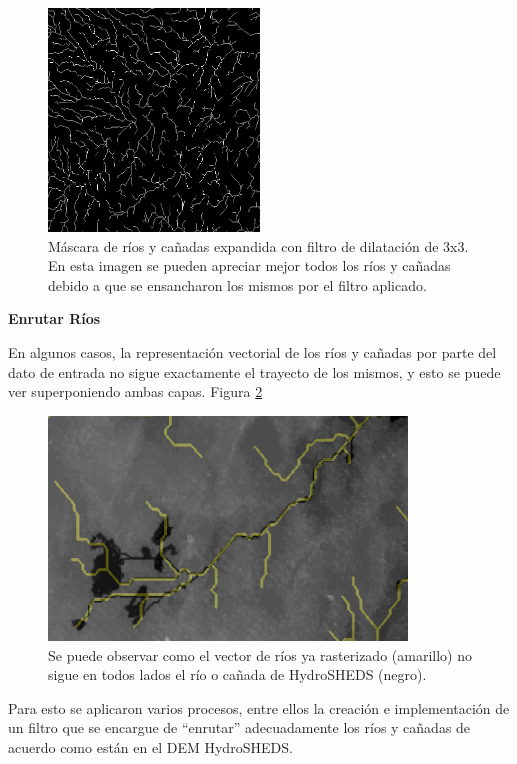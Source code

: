 \documentclass[10pt,a4paper, twoside]{report}
\begin{document}
\begin{figure}[H]
   \centering      
   \includegraphics[width=0.5\textwidth]{imagenes/riosExpandidos.jpg}
 \caption{Máscara de ríos y cañadas expandida con filtro de dilatación de 3x3. En esta imagen se pueden apreciar mejor todos los ríos y cañadas debido a que se ensancharon los mismos por el filtro aplicado.}
 \label{riosExpandidos}
\end{figure}

\textbf{Enrutar Ríos}

En algunos casos, la representación vectorial de los ríos y cañadas por parte del dato de entrada no sigue exactamente el trayecto de los mismos, y esto se puede ver superponiendo ambas capas. Figura \ref{riverToEnroute}

\begin{figure}[H]
   \centering      
   \includegraphics[width=0.85\textwidth]{imagenes/riverToEnroute.jpg}
 \caption{Se puede observar como el vector de ríos ya rasterizado (amarillo) no sigue en todos lados el río o cañada de HydroSHEDS (negro).}
 \label{riverToEnroute}
\end{figure}

Para esto se aplicaron varios procesos, entre ellos la creación e implementación de un filtro que se encargue de "`enrutar"' adecuadamente los ríos y cañadas de acuerdo como están en el DEM HydroSHEDS. 
\end{document}
